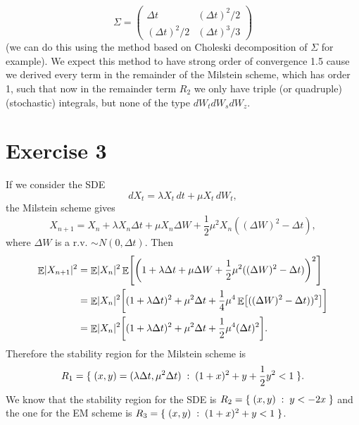 \documentclass[a4paper,11pt]{article}
\theoremstyle{definition}
\theoremstyle{plain}
\theoremstyle{remark}
\DeclarePairedDelimiter{\abs}{\lvert}{\rvert}
\DeclarePairedDelimiter{\parr}{(}{)}
\DeclarePairedDelimiter{\parq}{[}{]}
\DeclarePairedDelimiter{\bra}{\lbrace}{\rbrace}
\DeclareMathOperator*{\expval}{\mathbb{E}}
\begin{document}
$$
\Sigma = \left(\begin{matrix}
\Delta t & (\Delta t)^2/2 \\ (\Delta t)^2/2 & (\Delta t)^3/3
\end{matrix}\right)
$$
(we can do this using the method based on Choleski decomposition of $\Sigma$ for example). We expect this method to have strong order of convergence 1.5 cause we derived every term in the remainder of the Milstein scheme, which has order 1, such that now in the remainder term $R_2$ we only have triple (or quadruple) (stochastic) integrals, but none of the type $dW_tdW_sdW_z$.

\section*{Exercise 3}

If we consider the SDE
$$
dX_t = \lambda X_t\,dt + \mu X_t\,dW_t,
$$
the Milstein scheme gives
$$
X_{n+1} = X_n + \lambda X_n \Delta t + \mu X_n\Delta W + \frac{1}{2}\mu^2 X_n ((\Delta W)^2-\Delta t),
$$
where $\Delta W$ is a r.v. $\sim N(0,\Delta t)$. Then
\begin{align*}
\expval\abs{X_{n+1}}^2 & = \expval\abs{X_n}^2\expval\parq*{\parr*{1+\lambda\Delta t+\mu\Delta W + \frac{1}{2}\mu^2((\Delta W)^2-\Delta t)}^2} \\ & = \expval\abs{X_n}^2\parq*{(1+\lambda \Delta t)^2 + \mu^2\Delta t + \frac{1}{4}\mu^4\expval\parq*{((\Delta W)^2-\Delta t))^2}} \\ & = \expval\abs{X_n}^2\parq*{(1+\lambda \Delta t)^2 + \mu^2\Delta t + \frac{1}{2}\mu^4(\Delta t)^2}.
\end{align*}
Therefore the stability region for the Milstein scheme is
$$
R_1 = \bra{\;(x,y) = (\lambda\Delta t,\mu^2\Delta t)\;:\;(1+x)^2 + y + \frac{1}{2}y^2 < 1\;}.
$$
We know that the stability region for the SDE is $R_2 = \bra{\;(x,y)\;:\;y<-2x\;}$ and the one for the EM scheme is $R_3 = \bra{\;(x,y)\;:\;(1+x)^2 + y < 1\;}$.
\end{document}
